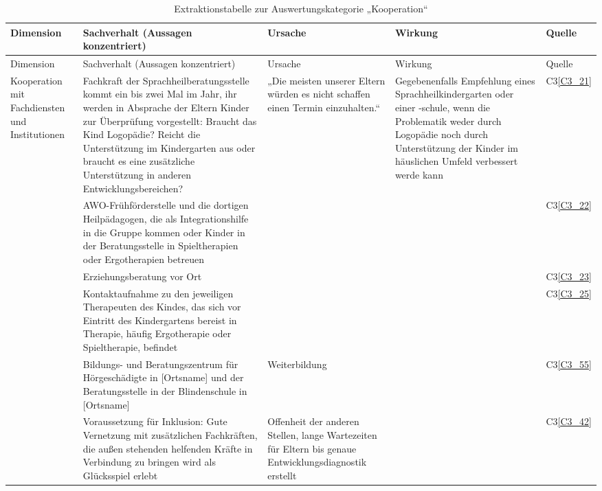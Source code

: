 \begin{landscape}
\begin{small}
\begin{centering}
\begin{longtable}{p{2cm}p{11cm}p{3cm}p{3cm}p{2cm}} 
\caption{Extraktionstabelle zur Auswertungskategorie „Kooperation“}\\
\toprule
Dimension & Sachverhalt (Aussagen konzentriert) & Ursache & Wirkung & Quelle\\
\midrule
\endfirsthead
\toprule
Dimension & Sachverhalt (Aussagen konzentriert) & Ursache & Wirkung & Quelle\\
\midrule
\endhead
\bottomrule
\endfoot
Kooperation mit Fachdiensten und Institutionen &
Fachkraft der Sprachheilberatungsstelle kommt ein bis zwei Mal im Jahr, ihr werden in Absprache der Eltern Kinder zur Überprüfung vorgestellt: Braucht das Kind Logopädie? Reicht die Unterstützung im Kindergarten aus oder braucht es eine zusätzliche Unterstützung in anderen Entwicklungsbereichen? & „Die meisten unserer Eltern würden es nicht schaffen einen Termin einzuhalten.“ & Gegebenenfalls Empfehlung eines Sprachheilkindergarten oder einer -schule, wenn die Problematik weder durch Logopädie noch durch Unterstützung der Kinder im häuslichen Umfeld verbessert werde kann & C3\ref{C3_21}\\

 & AWO-Frühförderstelle und die dortigen Heilpädagogen, die als Integrationshilfe in die Gruppe kommen oder Kinder in der Beratungsstelle in Spieltherapien oder Ergotherapien betreuen & & & C3\ref{C3_22}\\
 
 & Erziehungsberatung vor Ort & & & C3\ref{C3_23}\\ 
 
 & Kontaktaufnahme zu den jeweiligen Therapeuten des Kindes, das sich vor Eintritt des Kindergartens bereist in Therapie, häufig Ergotherapie oder Spieltherapie, befindet & & & C3\ref{C3_25}\\
 
 & Bildungs- und Beratungszentrum für Hörgeschädigte in {[Ortsname]} und der
Beratungsstelle in der Blindenschule in {[Ortsname]} & Weiterbildung
 & & C3\ref{C3_55}\\ 

 & Voraussetzung für Inklusion: Gute Vernetzung mit zusätzlichen Fachkräften, die außen stehenden helfenden Kräfte in Verbindung zu bringen wird als Glücksspiel erlebt & Offenheit der anderen Stellen,  lange Wartezeiten für Eltern bis genaue Entwicklungsdiagnostik erstellt 
& & C3\ref{C3_42}\\

\end{longtable}
\end{centering} 

\end{small}
\end{landscape}


